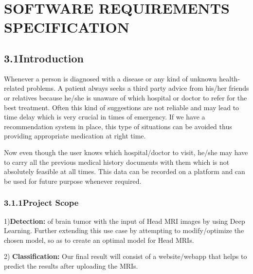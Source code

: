 \documentclass[oneside,a4paper,12pt]{book}
\begin{document}
\vspace{\baselineskip}

\vspace{\baselineskip}

\vspace{\baselineskip}
\chapter{SOFTWARE REQUIREMENTS SPECIFICATION}\par




\newpage

\vspace{\baselineskip}\section*{3.1\hspace*{10pt}Introduction}
\par
Whenever a person is diagnosed with a disease or any kind of unknown health-related problems. A patient always seeks a third party advice from his/her friends or relatives because he/she is unaware of which hospital or doctor to refer for the best treatment. Often this kind of suggestions are not reliable and may lead to time delay which is very crucial in times of emergency. If we have a recommendation system in place, this type of situations can be avoided thus providing appropriate medication at right time. 
\par
Now even though the user knows which hospital/doctor to visit, he/she may have to carry all the previous medical history documents with them which is not absolutely feasible at all times. This data can be recorded on a platform and can be used for future purpose whenever required. 
\subsection*{3.1.1\hspace*{10pt}Project Scope}



 1)\textbf{Detection:} of brain tumor with the input of Head MRI images by using Deep Learning. Further extending this use case by attempting to modify/optimize the chosen model, so as to create an optimal model for Head MRIs.\par 2) \textbf{Classification:} Our final result will consist of a website/webapp that helps to predict the results after uploading the MRIs.
\par
\end{document}
